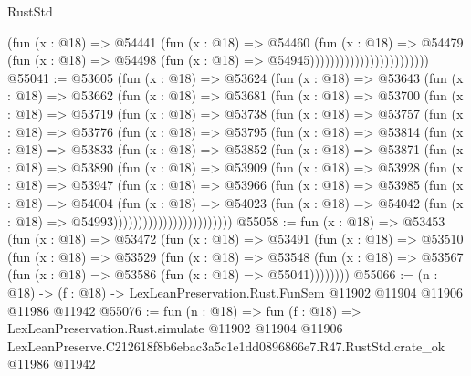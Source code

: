 \begin{lexlean}{RustStd}
\begin{coremodule}
                                          (fun (x : @18) =>
                                          @54441
                                            (fun (x : @18) =>
                                            @54460
                                              (fun (x : @18) =>
                                              @54479
                                                (fun (x : @18) =>
                                                @54498
                                                  (fun (x : @18) => @54945))))))))))))))))))))))))
@55041 := @53605
    (fun (x : @18) =>
    @53624
      (fun (x : @18) =>
      @53643
        (fun (x : @18) =>
        @53662
          (fun (x : @18) =>
          @53681
            (fun (x : @18) =>
            @53700
              (fun (x : @18) =>
              @53719
                (fun (x : @18) =>
                @53738
                  (fun (x : @18) =>
                  @53757
                    (fun (x : @18) =>
                    @53776
                      (fun (x : @18) =>
                      @53795
                        (fun (x : @18) =>
                        @53814
                          (fun (x : @18) =>
                          @53833
                            (fun (x : @18) =>
                            @53852
                              (fun (x : @18) =>
                              @53871
                                (fun (x : @18) =>
                                @53890
                                  (fun (x : @18) =>
                                  @53909
                                    (fun (x : @18) =>
                                    @53928
                                      (fun (x : @18) =>
                                      @53947
                                        (fun (x : @18) =>
                                        @53966
                                          (fun (x : @18) =>
                                          @53985
                                            (fun (x : @18) =>
                                            @54004
                                              (fun (x : @18) =>
                                              @54023
                                                (fun (x : @18) =>
                                                @54042
                                                  (fun (x : @18) => @54993))))))))))))))))))))))))
@55058 := fun (x : @18) =>
  @53453
    (fun (x : @18) =>
    @53472
      (fun (x : @18) =>
      @53491
        (fun (x : @18) =>
        @53510
          (fun (x : @18) =>
          @53529
            (fun (x : @18) =>
            @53548
              (fun (x : @18) => @53567 (fun (x : @18) => @53586 (fun (x : @18) => @55041))))))))
@55066 := (n : @18) ->
  (f : @18) -> LexLeanPreservation.Rust.FunSem @11902 @11904 @11906 @11986 @11942
@55076 := fun (n : @18) =>
  fun (f : @18) =>
  LexLeanPreservation.Rust.simulate
    @11902
    @11904
    @11906
    LexLeanPreserve.C212618f8b6ebac3a5c1e1dd0896866e7.R47.RustStd.crate_ok
    @11986
    @11942
\end{coremodule}
\end{lexlean}
